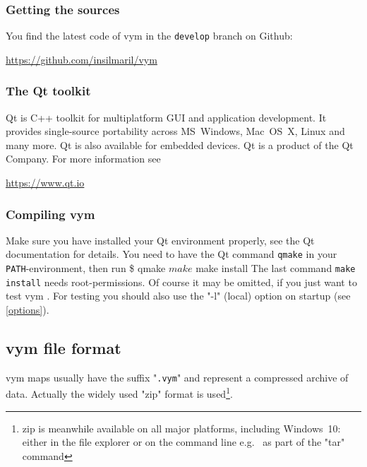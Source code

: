 \documentclass[12pt,a4paper]{article}
\newcommand{\vym}{{\sc vym }}
\newenvironment{code}[1] { \verbatim #1}{\endverbatim  }
\begin{document}
\begin{appendix}
\subsubsection{Getting the sources} \label{getsources}
You find the latest code of \vym in the {\tt develop} branch on Github:
\begin{center}
    \href{ https://github.com/insilmaril/vym}{https://github.com/insilmaril/vym}
\end{center}

\subsubsection{The Qt toolkit}
Qt is C++ toolkit for multiplatform GUI and application development. It
provides single-source portability across MS~Windows, Mac~OS~X, Linux
and many more. Qt is also available for
embedded devices. Qt is a product of the Qt Company. For more information see
\begin{center} 
    \href{https://www.qt.io}{https://www.qt.io} 
\end{center}



\subsubsection{Compiling \vym }
Make sure you have installed your Qt environment properly, see the Qt
documentation for details. You need to have the Qt command {\tt qmake}
in your {\tt PATH}-environment, then run
\begin{code}
\$ qmake
$ make  
$ make install
\end{code}
The last command {\tt make install} needs root-permissions. Of course it
may be omitted, if you just want to test \vym. For testing you should
also use the "-l" (local) option on startup (see \ref{options}).


\subsection{\vym file format} \label{fileformat}
\vym maps usually have the suffix "{\tt .vym}" and represent a
compressed archive of data. Actually the widely used "zip" format
is used\footnote{zip is meanwhile available on all major platforms,
including Windows~10: either in the file explorer or on the command line
e.g.~ as part of the "tar" command}.


\end{appendix}
\end{document}
